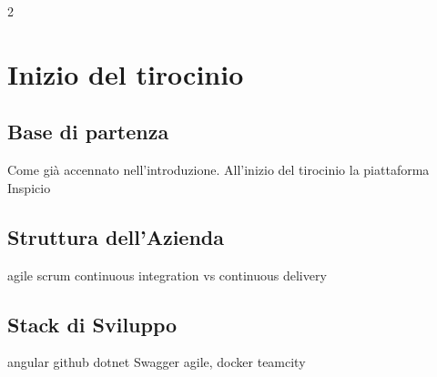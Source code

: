 2\chapter{Inizio del tirocinio}

\section{Base di partenza}

Come già accennato nell'introduzione. All'inizio del tirocinio la piattaforma Inspicio

\section{Struttura dell'Azienda}

agile
scrum
continuous integration vs continuous delivery

\lipsum[2]

\section{Stack di Sviluppo}

angular
github
dotnet
Swagger
agile,
docker
teamcity


\lipsum[2]










